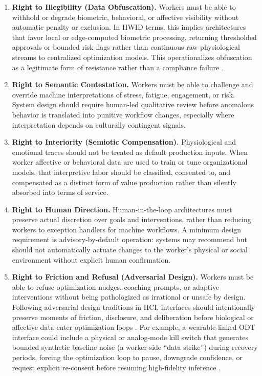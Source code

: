 \documentclass[runningheads]{llncs}
\begin{document}
\begin{enumerate}
\item \textbf{Right to Illegibility (Data Obfuscation).} Workers must be able to withhold or degrade biometric, behavioral, or affective visibility without automatic penalty or exclusion. In HWID terms, this implies architectures that favor local or edge-computed biometric processing, returning thresholded approvals or bounded risk flags rather than continuous raw physiological streams to centralized optimization models. This operationalizes obfuscation as a legitimate form of resistance rather than a compliance failure \cite{nissenbaum2015obfuscation}.

\item \textbf{Right to Semantic Contestation.} Workers must be able to challenge and override machine interpretations of stress, fatigue, engagement, or risk. System design should require human-led qualitative review before anomalous behavior is translated into punitive workflow changes, especially where interpretation depends on culturally contingent signals.

\item \textbf{Right to Interiority (Semiotic Compensation).} Physiological and emotional traces should not be treated as default production inputs. When worker affective or behavioral data are used to train or tune organizational models, that interpretive labor should be classified, consented to, and compensated as a distinct form of value production rather than silently absorbed into terms of service.

\item \textbf{Right to Human Direction.} Human-in-the-loop architectures must preserve actual discretion over goals and interventions, rather than reducing workers to exception handlers for machine workflows. A minimum design requirement is advisory-by-default operation: systems may recommend but should not automatically actuate changes to the worker's physical or social environment without explicit human confirmation.

\item \textbf{Right to Friction and Refusal (Adversarial Design).} Workers must be able to refuse optimization nudges, coaching prompts, or adaptive interventions without being pathologized as irrational or unsafe by design. Following adversarial design traditions in HCI, interfaces should intentionally preserve moments of friction, disclosure, and deliberation before biological or affective data enter optimization loops \cite{disalvo2012adversarial}. For example, a wearable-linked ODT interface could include a physical or analog-mode kill switch that generates bounded synthetic baseline noise (a worker-side ``data strike'') during recovery periods, forcing the optimization loop to pause, downgrade confidence, or request explicit re-consent before resuming high-fidelity inference \cite{nissenbaum2015obfuscation}.


\end{enumerate}
\end{document}

